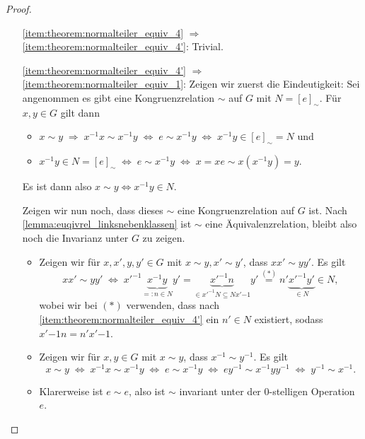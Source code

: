 \begin{proof}{\ }
\begin{itemize}[topsep=0cm, leftmargin=2.2cm]
        \item[\ref*{item:theorem:normalteiler_equiv_4} $\Rightarrow$ \ref*{item:theorem:normalteiler_equiv_4'}:] 
        Trivial.
        
        \item[\ref*{item:theorem:normalteiler_equiv_4'} $\Rightarrow$ \ref*{item:theorem:normalteiler_equiv_1}:]  
        Zeigen wir zuerst die Eindeutigkeit: Sei angenommen es gibt eine Kongruenzrelation $\sim$ auf $G$ mit $N = [e]_\sim$. Für $x, y\in G$ gilt dann 
        \begin{itemize}[label={--}]
            \item $x \sim y \;\Rightarrow\; x^{-1}x \sim x^{-1}y \; \Leftrightarrow\; e \sim x^{-1}y \;\Leftrightarrow\; x^{-1}y \in [e]_\sim = N$ und
            \item $x^{-1}y \in N = [e]_\sim \;\Leftrightarrow\; e \sim x^{-1}y \;\Leftrightarrow\; x = xe \sim x(x^{-1}y) = y$.
        \end{itemize}
        Es ist dann also $x \sim y \Leftrightarrow x^{-1}y \in N$. 
        
        Zeigen wir nun noch, dass dieses $\sim$ eine Kongruenzrelation auf $G$ ist. Nach \cref{lemma:euqivrel_linksnebenklassen} ist $\sim$ eine Äquivalenzrelation, bleibt also noch die Invarianz unter $G$ zu zeigen. 
        \begin{itemize}[label={--}]
            \item Zeigen wir für $x,x',y,y' \in G$ mit $x \sim y, x' \sim y'$, dass $xx'\sim yy'$. Es gilt 
            $$ xx'\sim yy' \;\Leftrightarrow\; x'^{-1}\underbrace{x^{-1}y}_{=: n \in N} y' = \underbrace{x'^{-1} n}_{\in x'^{-1}N \subseteq Nx'{-1}} y' \overset{(*)}{=} n'\underbrace{x'^{-1}y'}_{\in N} \in N, $$
            wobei wir bei $(*)$ verwenden, dass nach \ref*{item:theorem:normalteiler_equiv_4'} ein $n' \in N$ existiert, sodass $x'{-1} n = n' x'{-1}$.
            \item Zeigen wir für $x,y \in G$ mit $x \sim y$, dass $x^{-1} \sim y^{-1}$. Es gilt
            $$ x\sim y \;\Leftrightarrow\; x^{-1}x \sim x^{-1}y \;\Leftrightarrow\; e \sim x^{-1}y \;\Leftrightarrow\; ey^{-1} \sim x^{-1} y y^{-1} \;\Leftrightarrow\; y^{-1} \sim x^{-1}.$$ 
            \item Klarerweise ist $e \sim e$, also ist $\sim$ invariant unter der 0-stelligen Operation $e$.
        \end{itemize}
    \end{itemize}
\end{proof}

